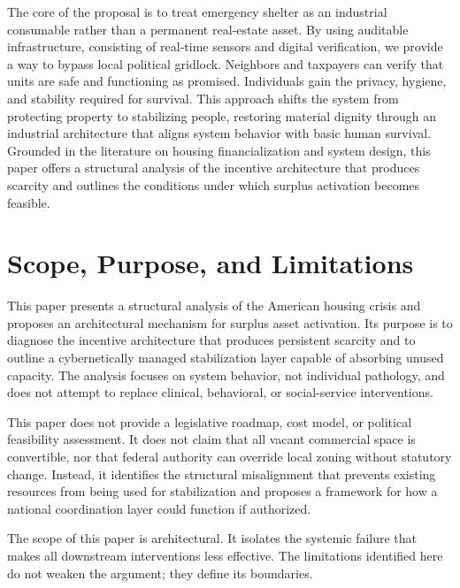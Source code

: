 \documentclass[
  12pt,
]{article}
\begin{document}
The core of the proposal is to treat emergency shelter as an industrial consumable rather than a permanent real‑estate asset. By using auditable infrastructure, consisting of real‑time sensors and digital verification, we provide a way to bypass local political gridlock. Neighbors and taxpayers can verify that units are safe and functioning as promised. Individuals gain the privacy, hygiene, and stability required for survival. This approach shifts the system from protecting property to stabilizing people, restoring material dignity through an industrial architecture that aligns system behavior with basic human survival. Grounded in the literature on housing financialization and system design, this paper offers a structural analysis of the incentive architecture that produces scarcity and outlines the conditions under which surplus activation becomes feasible.

\newpage

\hypertarget{scope-purpose-and-limitations}{%
\section{Scope, Purpose, and Limitations}\label{scope-purpose-and-limitations}}

This paper presents a structural analysis of the American housing crisis and proposes an architectural mechanism for surplus asset activation. Its purpose is to diagnose the incentive architecture that produces persistent scarcity and to outline a cybernetically managed stabilization layer capable of absorbing unused capacity. The analysis focuses on system behavior, not individual pathology, and does not attempt to replace clinical, behavioral, or social-service interventions.

This paper does not provide a legislative roadmap, cost model, or political feasibility assessment. It does not claim that all vacant commercial space is convertible, nor that federal authority can override local zoning without statutory change. Instead, it identifies the structural misalignment that prevents existing resources from being used for stabilization and proposes a framework for how a national coordination layer could function if authorized.

The scope of this paper is architectural. It isolates the systemic failure that makes all downstream interventions less effective. The limitations identified here do not weaken the argument; they define its boundaries.

\newpage
\end{document}
